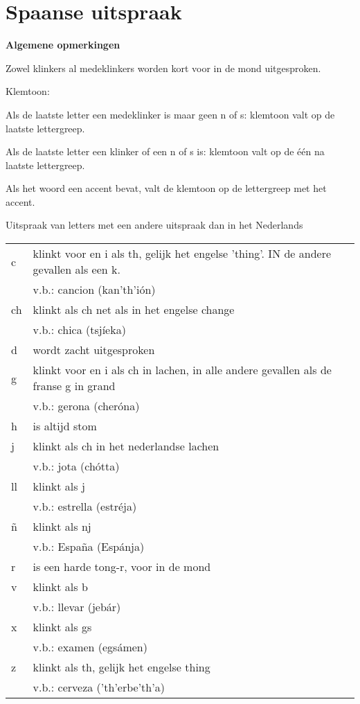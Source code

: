 \section{Spaanse uitspraak}
\vspace{-20pt}
\textbf{Algemene opmerkingen}
\vspace{-12pt}
\begin{compactenum}
\item Zowel klinkers al medeklinkers worden kort voor in de mond uitgesproken.
\item Klemtoon:
\begin{compactenum}
\item Als de laatste letter een medeklinker is maar geen n of s: klemtoon valt op de laatste lettergreep.
\item Als de laatste letter een klinker of een n of s is: klemtoon valt op de \'e\'en na laatste lettergreep.
\item Als het woord een accent bevat, valt de klemtoon op de lettergreep met het accent.
\end{compactenum}
\end{compactenum}

Uitspraak van letters met een andere uitspraak dan in het Nederlands\\
\begin{tabularx}{1.0\textwidth}{l l}
c & klinkt voor en i als th, gelijk het engelse 'thing'. IN de andere gevallen als een k.\\
 & v.b.: cancion (kan'th'i\'on)\\
ch & klinkt als ch net als in het engelse change\\
 & v.b.: chica (tsj\'ieka)\\
d & wordt zacht uitgesproken\\
g & klinkt voor en i als ch in lachen, in alle andere gevallen als de franse g in grand\\
 & v.b.: gerona (cher\'ona)\\
h & is altijd stom\\
j & klinkt als ch in het nederlandse lachen\\
 & v.b.: jota (ch\'otta)\\
ll & klinkt als j\\
 & v.b.: estrella (estr\'eja)\\
\~{n} & klinkt als nj\\
 & v.b.: Espa\~na (Esp\'anja)\\
r & is een harde tong-r, voor in de mond\\
v & klinkt als b\\
 & v.b.: llevar (jeb\'ar)\\
x & klinkt als gs\\
 & v.b.: examen (egs\'amen)\\
z & klinkt als th, gelijk het engelse thing\\
 & v.b.: cerveza ('th'erbe'th'a)\\
\end{tabularx}

